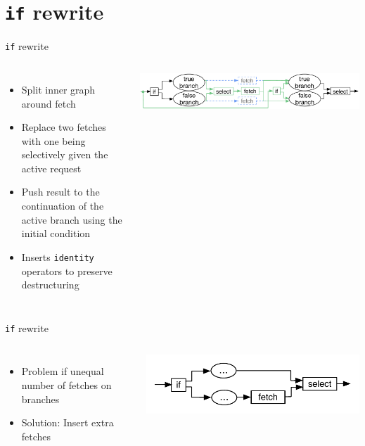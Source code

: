 \documentclass[utf8x,10pt,aspectratio=169]{beamer}
\begin{document}
\section{\texttt{if} rewrite}
\begin{frame}{\texttt{if} rewrite}
	\begin{columns}
		\begin{itemize}[<+->]
			\item Split inner graph around fetch
			\item Replace two fetches with one being selectively given the active request
			\item Push result to the continuation of the active branch using the initial condition
			\item Inserts \texttt{identity} operators to preserve destructuring
		\end{itemize}
		\includegraphics[width=\textwidth]{graphs/basic-if-rewrite}
	\end{columns}
\end{frame}

\addtocounter{framenumber}{-1}

\begin{frame}{\texttt{if} rewrite}
	\begin{columns}
		\column{0.4\textwidth}
		\begin{itemize}[<+->]
			\item Problem if unequal number of fetches on branches
			\item Solution: Insert extra fetches
		\end{itemize}
		\column{0.6\textwidth}
		\includegraphics[width=\textwidth]{graphs/insert-empty-fetches}
	\end{columns}
\end{frame}
%
\addtocounter{framenumber}{-1}
\end{document}
